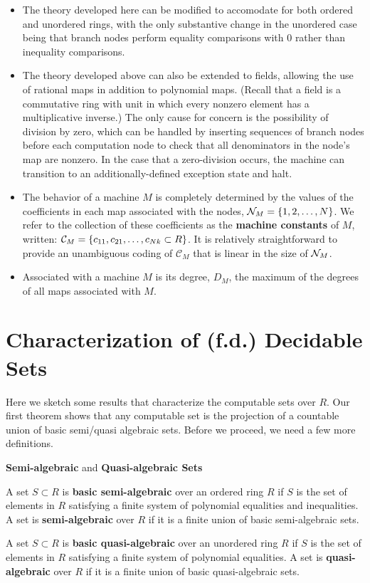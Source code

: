 \begin{itemize}
\item The theory developed here can be modified to accomodate for both
  ordered and unordered rings, with the only substantive change in the
  unordered case being that branch nodes perform equality comparisons
  with 0 rather than inequality comparisons.

\item The theory developed above can also be extended to fields,
  allowing the use of rational maps in addition to polynomial maps.
  (Recall that a field is a commutative ring with unit in which every
  nonzero element has a multiplicative inverse.)  The only cause for
  concern is the possibility of division by zero, which can be handled
  by inserting sequences of branch nodes before each computation node
  to check that all denominators in the node's map are nonzero.  In
  the case that a zero-division occurs, the machine can transition to
  an additionally-defined exception state and halt.

\item The behavior of a machine $M$ is completely determined by the
  values of the coefficients in each map associated with the nodes,
  $\mathcal{N}_M = \{1, 2, \ldots, N\}$.  We refer to the collection of
  these coefficients as the \textbf{machine constants} of $M$,
  written: $\mathcal{C}_M = \{c_{11}, c_{21}, \ldots, c_{Nk}
    \subset R\}$.  It is relatively straightforward to provide an
  unambiguous coding of $\mathcal{C}_M$ that is linear in the size of
  $\mathcal{N}_M$.

\item Associated with a machine $M$ is its degree, $D_M$, the maximum
  of the degrees of all maps associated with $M$.
\end{itemize}

\section{Characterization of (f.d.) Decidable Sets}

Here we sketch some results that characterize the computable sets over
$R$.  Our first theorem shows that any computable set is the
projection of a countable union of basic semi/quasi algebraic sets.
Before we proceed, we need a few more definitions.

  \begin{definition}{\textbf{Semi-algebraic} and \textbf{Quasi-algebraic Sets}}
    
    A set $S \subset R$ is \textbf{basic semi-algebraic} over an
    ordered ring $R$ if $S$ is the set of elements in $R$ satisfying
    a finite system of polynomial equalities and inequalities. A set
    is \textbf{semi-algebraic} over $R$ if it is a finite union of basic
    semi-algebraic sets.

    A set $S \subset R$ is \textbf{basic quasi-algebraic} over an
    unordered ring $R$ if $S$ is the set of elements in $R$ satisfying
    a finite system of polynomial equalities. A set is
    \textbf{quasi-algebraic} over $R$ if it is a finite union of basic
    quasi-algebraic sets.
    
  \end{definition}


